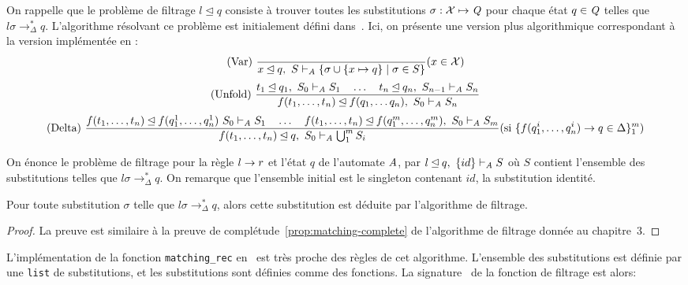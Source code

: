 On rappelle que le problème de filtrage $l \unlhd q$ consiste à trouver toutes les substitutions
$\sigma:\mathcal X \mapsto \mathit Q$ pour chaque état $q \in \mathit Q$ telles que 
$l\sigma \rightarrow_\Delta^* q$. L'algorithme résolvant ce problème est initialement 
défini dans~\cite{Genet-RR97b}. Ici, on présente une version plus algorithmique correspondant 
à la version implémentée en \coq:
{\footnotesize
  \[\textrm{(Var) }
  \dfrac{}{x \unlhd q,\ S \vdash_\mathit A \{\sigma \cup \{x \mapsto q\} \; | \; \sigma \in S \}}
  (x \in \mathcal X)
  \]
  \[\textrm{(Unfold) }
  \dfrac{
    t_1 \unlhd q_1, \ S_0 \vdash_\mathit A S_1
    \quad \dots \quad
    t_n \unlhd q_n, \ S_{n-1} \vdash_\mathit A S_n
  }{f(t_1, \dots, t_n) \unlhd f(q_1, \dots q_n),\ S_0 \vdash_\mathit A S_n}
  \]
  \hspace*{-1cm}
  \[
  \textrm{(Delta) }
   \dfrac{
     f(t_1, \dots, t_n) \unlhd f(q_1^1, \dots, q_n^1)\ S_0 \vdash_\mathit A S_1
     \quad \dots \quad
     f(t_1 ,\dots, t_n) \unlhd f(q_1^m, \dots, q_n^m),\ S_0 \vdash_\mathit A S_m
   }{
     f(t_1, \dots, t_n) \unlhd q,\ S_0 \vdash_\mathit A \bigcup_1^m S_i
   }
   (
   \textrm{si } \{ f(q_1^i, \dots, q_n^i) \rightarrow q \in \Delta\} _1^m 
   )
   \]
 }

On énonce le problème de filtrage pour la règle $l \rightarrow r$ et l'état $q$ de l'automate $\mathit A$,
par $l\unlhd q,\ \{id\} \vdash_\mathit A S$ où $S$ contient l'ensemble des substitutions telles que
$l\sigma \rightarrow_\Delta^* q$. On remarque que l'ensemble initial est le singleton contenant $id$,
la substitution identité.

\begin{theorem}
  \label{th:completeness}
  Pour toute substitution $\sigma$ telle que $l\sigma \rightarrow_\Delta^* q$, alors 
  cette substitution est déduite par l'algorithme de filtrage.
\end{theorem}

\begin{proof}
  La preuve est similaire à la preuve de complétude~\ref{prop:matching-complete} de l'algorithme de filtrage
  donnée au chapitre~3.
\end{proof}

L'implémentation de la fonction \lstinline!matching_rec! en \coq\ est très proche
des règles de cet algorithme. L'ensemble des substitutions est définie par une 
\lstinline!list! de substitutions, et les substitutions sont définies comme des fonctions.
La signature \coq\ de la fonction de filtrage est alors:

